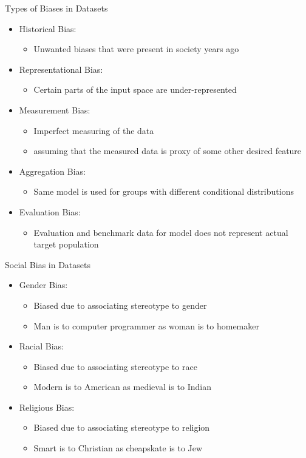 \documentclass{beamer}
\begin{document}
		\begin{frame}{Types of Biases in Datasets}
			\begin{itemize}
				\item Historical Bias:
				\begin{itemize}
					\item Unwanted biases that were present in society years ago
				\end{itemize}
				\item Representational Bias:
				\begin{itemize}
					\item Certain parts of the input space are under-represented
				\end{itemize}
				\item Measurement Bias:
				\begin{itemize}
					\item Imperfect measuring of the data
					\item assuming that the measured data is proxy of some other desired feature
				\end{itemize}
				\item Aggregation Bias:
				\begin{itemize}
					\item Same model is used for groups with different conditional distributions
				\end{itemize}
				\item Evaluation Bias:
				\begin{itemize}
					\item Evaluation and benchmark data for model does not represent actual target population
				\end{itemize}
			\end{itemize}
			
		\end{frame}
		\begin{frame}{Social Bias in Datasets}
			\begin{itemize}
				\item Gender Bias:
				\begin{itemize}
					\item Biased due to associating stereotype to gender
					\item Man is to computer programmer as woman is to homemaker
				\end{itemize}
				\item Racial Bias:
				\begin{itemize}
					\item Biased due to associating stereotype to race
					\item Modern is to American as medieval is to Indian
				\end{itemize}
				\item Religious Bias:
				\begin{itemize}
					\item Biased due to associating stereotype to religion
					\item Smart is to Christian as cheapskate is to Jew
				\end{itemize}
			\end{itemize}
			
		\end{frame}
		
\end{document}
